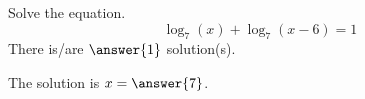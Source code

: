 \documentclass{ximera}
\author{Bobby Ramsey}
\begin{document}
\begin{exercise}
	Solve the equation.
	\[ \log_7(x) + \log_7(x-6) = 1 \]
	There is/are $\answer{1}$ solution(s).
	\begin{exercise}
		The solution is $x = \answer{7}$.
	\end{exercise}
\end{exercise}
\end{document}
